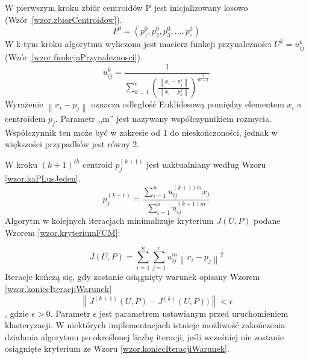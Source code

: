 \documentclass[a4paper,twoside,12pt]{book}
\begin{document}
    W pierwszym kroku zbiór centroidów P jest inicjalizowany losowo (Wzór~\ref{wzor.zbiorCentroidow}).
    \large
    \begin{equation}
        P^{0}=(p_{1}^{0}, p_{2}^{0}, p_{3}^{0}, \ldots, p_{c}^{0})
        \label{wzor.zbiorCentroidow}
    \end{equation}
    \normalsize
    W k-tym kroku algorytmu wyliczona jest macierz funkcji przynależności $U^{k} = {u_{ij}^{k}}$ (Wzór~\ref{wzor.funkcjaPrzynaleznosci}).
    \large
    \begin{equation}
        u_{ij}^{k} = \frac{1}{\sum_{k=1}^{c}\left ( \frac{\left \| x_{i} - p_{j}^{k} \right \|}{\left \|x_{i} - p_{k}^{k}  \right \|} \right )^{\frac{2}{m-1}}}
        \label{wzor.funkcjaPrzynaleznosci}
    \end{equation}
    \normalsize
    Wyrażenie $\left \| x_{i} - p_{j} \right \|$ oznacza odległość Euklidesową pomiędzy elementem $x_{i}$ a
    centroidem $p_{j}$. Parametr ,,m'' jest nazywany współczynnikiem rozmycia. Współczynnik ten może być w zakresie
    od 1 do nieskończoności, jednak w większości przypadków jest równy 2.

    W kroku $(k+1)^{th}$ centroid $p_{j}^{(k+1)}$ jest uaktualniany według Wzoru \ref{wzor.kaPLusJeden}.
    \large
    \begin{equation}
        p_{j}^{(k+1)}=\frac{\sum_{i=1}^{n}u_{ij}^{(k+1)m}x_{j}}{\sum_{i=1}^{n}u_{ij}^{(k+1)m}}
        \label{wzor.kaPLusJeden}
    \end{equation}
    \normalsize
    Algorytm w kolejnych iteracjach minimalizuje kryterium $J(U,P)$ podane Wzorem \ref{wzor.kryteriumFCM}:

    \large
    \begin{equation}
        J(U,P)= \sum_{i=1}^{n}\sum_{j=1}^{c}u_{ij}^{m}\left \| x_{i}-p_{j} \right \|^{2}
        \label{wzor.kryteriumFCM}
    \end{equation}
    \normalsize
    Iteracje kończą się, gdy zostanie osiągnięty warunek opisany Wzorem \ref{wzor.koniecIteracjiWarunek}
    \large
    \begin{equation}
        \left \| J^{(k+1)}(U,P) - J^{(k)}(U,P)) \right \| < \epsilon
        \label{wzor.koniecIteracjiWarunek}
    \end{equation}
    \normalsize
    , gdzie $\epsilon > 0$. Parametr $\epsilon$ jest parametrem ustawianym przed uruchomieniem klasteryzacji.
    W niektórych implementacjach istnieje możliwość zakończenia działania algorytmu po określonej liczbę iteracji,
    jeśli wcześniej nie zostanie osiągnięte kryterium ze Wzoru \ref{wzor.koniecIteracjiWarunek}.
\end{document}
